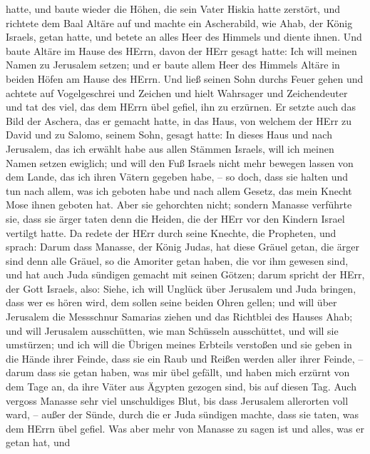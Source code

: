 hatte,  und baute wieder die Höhen, die sein Vater Hiskia
hatte zerstört, und richtete dem Baal Altäre auf und machte ein
Ascherabild, wie Ahab, der König Israels, getan hatte, und betete an
alles Heer des Himmels und diente ihnen.  Und baute Altäre
im Hause des HErrn, davon der HErr gesagt hatte: Ich will meinen Namen
zu Jerusalem setzen;  und er baute allem Heer des Himmels
Altäre in beiden Höfen am Hause des HErrn.  Und ließ seinen
Sohn durchs Feuer gehen und achtete auf Vogelgeschrei und Zeichen und
hielt Wahrsager und Zeichendeuter und tat des viel, das dem HErrn übel
gefiel, ihn zu erzürnen.  Er setzte auch das Bild der
Aschera, das er gemacht hatte, in das Haus, von welchem der HErr zu
David und zu Salomo, seinem Sohn, gesagt hatte: In dieses Haus und nach
Jerusalem, das ich erwählt habe aus allen Stämmen Israels, will ich
meinen Namen setzen ewiglich;  und will den Fuß Israels
nicht mehr bewegen lassen von dem Lande, das ich ihren Vätern gegeben
habe, -- so doch, dass sie halten und tun nach allem, was ich geboten
habe und nach allem Gesetz, das mein Knecht Mose ihnen geboten hat.
 Aber sie gehorchten nicht; sondern Manasse verführte sie,
dass sie ärger taten denn die Heiden, die der HErr vor den Kindern
Israel vertilgt hatte.  Da redete der HErr durch seine
Knechte, die Propheten, und sprach:  Darum dass Manasse,
der König Judas, hat diese Gräuel getan, die ärger sind denn alle
Gräuel, so die Amoriter getan haben, die vor ihm gewesen sind, und hat
auch Juda sündigen gemacht mit seinen Götzen;  darum
spricht der HErr, der Gott Israels, also: Siehe, ich will Unglück über
Jerusalem und Juda bringen, dass wer es hören wird, dem sollen seine
beiden Ohren gellen;  und will über Jerusalem die
Messschnur Samarias ziehen und das Richtblei des Hauses Ahab; und will
Jerusalem ausschütten, wie man Schüsseln ausschüttet, und will sie
umstürzen;  und ich will die Übrigen meines Erbteils
verstoßen und sie geben in die Hände ihrer Feinde, dass sie ein Raub und
Reißen werden aller ihrer Feinde, --  darum dass sie getan
haben, was mir übel gefällt, und haben mich erzürnt von dem Tage an, da
ihre Väter aus Ägypten gezogen sind, bis auf diesen Tag. 
Auch vergoss Manasse sehr viel unschuldiges Blut, bis dass Jerusalem
allerorten voll ward, -- außer der Sünde, durch die er Juda sündigen
machte, dass sie taten, was dem HErrn übel gefiel.  Was
aber mehr von Manasse zu sagen ist und alles, was er getan hat, und
